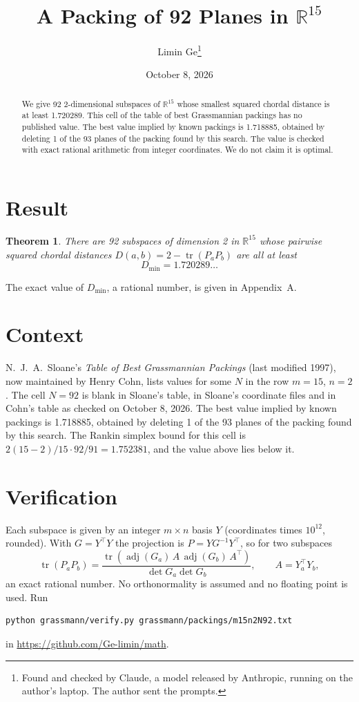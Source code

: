 \documentclass[11pt,a4paper]{article}
\title{A Packing of 92 Planes in $\mathbb{R}^{15}$}
\author{Limin Ge\thanks{Found and checked by Claude, a model released by Anthropic, running on the author's laptop. The author sent the prompts.}}
\date{October 8, 2026}
\newtheorem*{theorem}{Theorem}
\begin{document}
\maketitle
\begin{abstract}
We give 92 2-dimensional subspaces of $\mathbb{R}^{15}$ whose smallest squared chordal distance is at least 1.720289. This cell of the table of best Grassmannian packings has no published value. The best value implied by known packings is 1.718885, obtained by deleting 1 of the 93 planes of the packing found by this search. The value is checked with exact rational arithmetic from integer coordinates. We do not claim it is optimal.
\end{abstract}

\section{Result}
\begin{theorem}
There are 92 subspaces of dimension 2 in $\mathbb{R}^{15}$ whose pairwise squared chordal distances $D(a,b) = 2 - \operatorname{tr}(P_aP_b)$ are all at least
\[ D_{\min} = 1.720289\ldots \]
\end{theorem}
The exact value of $D_{\min}$, a rational number, is given in Appendix~A.


\section{Context}
N.~J.~A.~Sloane's \emph{Table of Best Grassmannian Packings} (last modified 1997), now maintained by Henry Cohn, lists values for some $N$ in the row $m=15$, $n=2$. The cell $N=92$ is blank in Sloane's table, in Sloane's coordinate files and in Cohn's table as checked on October 8, 2026. The best value implied by known packings is 1.718885, obtained by deleting 1 of the 93 planes of the packing found by this search. The Rankin simplex bound for this cell is $2(15-2)/15\cdot 92/91 = 1.752381$, and the value above lies below it.


\section{Verification}
Each subspace is given by an integer $m\times n$ basis $Y$ (coordinates times $10^{12}$, rounded). With $G=Y^\top Y$ the projection is $P=YG^{-1}Y^\top$, so for two subspaces
\[ \operatorname{tr}(P_aP_b)=\frac{\operatorname{tr}(\operatorname{adj}(G_a)\,A\,\operatorname{adj}(G_b)\,A^\top)}{\det G_a\det G_b},\qquad A=Y_a^\top Y_b, \]
an exact rational number. No orthonormality is assumed and no floating point is used. Run
\begin{verbatim}
python grassmann/verify.py grassmann/packings/m15n2N92.txt
\end{verbatim}
in \url{https://github.com/Ge-limin/math}.
\end{document}
